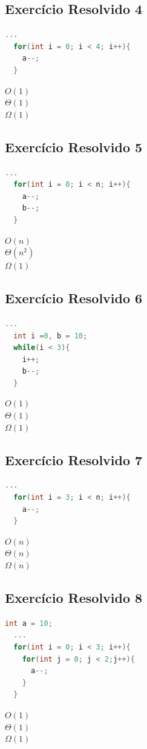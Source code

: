 \documentclass[12pt]{article}
\begin{document}
\subsection{Exercício Resolvido 4}
\begin{lstlisting}[language=C]
  ...
  for(int i = 0; i < 4; i++){
    a--;
  }
\end{lstlisting}
$O(1)$\\
$\Theta(1)$\\
$\Omega(1)$\\

\subsection{Exercício Resolvido 5}
\begin{lstlisting}[language=C]
  ...
  for(int i = 0; i < n; i++){
    a--;
    b--;
  }
\end{lstlisting}
$O(n)$\\
$\Theta(n^2)$\\
$\Omega(1)$\\

\subsection{Exercício Resolvido 6}
\begin{lstlisting}[language=C]
  ...
  int i =0, b = 10;
  while(i < 3){
    i++;
    b--;
  }
\end{lstlisting}
$O(1)$\\
$\Theta(1)$\\
$\Omega(1)$\\

\subsection{Exercício Resolvido 7}
\begin{lstlisting}[language=C]
  ...
  for(int i = 3; i < n; i++){
    a--;
  }
\end{lstlisting}
$O(n)$\\
$\Theta(n)$\\
$\Omega(n)$\\

\subsection{Exercício Resolvido 8}
\begin{lstlisting}[language=C]
  int a = 10;
  ...
  for(int i = 0; i < 3; i++){
    for(int j = 0; j < 2;j++){
      a--;
    }
  }
\end{lstlisting}
$O(1)$\\
$\Theta(1)$\\
$\Omega(1)$\\
\end{document}
